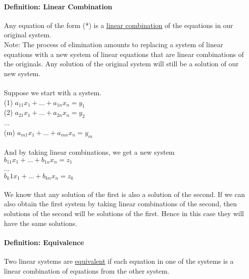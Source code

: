 \documentclass[10pt,letter]{article}
\begin{document}
\paragraph*{Definition: Linear Combination} Any equation of the form (*) is a \underline{linear combination} of the equations in our original system. \\ 
Note: The process of elimination amounts to replacing a system of linear equations with a new system of linear equations that are linear combinations of the originals. Any solution of the original system will still be a solution of our new system. \\ \\ 
Suppose we start with a system. \\ 
(1) $a_{11}x_1 + ... +a_{1n}x_n = y_1$ \\ 
(2) $a_{21}x_1 + ... +a_{2n}x_n = y_2$\\ 
... \\ 
(m) $a_{m1}x_1 + ... +a_{mn}x_n = y_m$ \\ \\ 
And by taking linear combinations, we get a new system\\ 
$b_11x_1+...+b_{1n}x_n = z_1$\\ 
... \\ 
$b_k1x_1+...+b_{kn}x_n=z_k$\\ \\ 
We know that any solution of the first is also a solution of the second. If  we can also obtain the first system by taking linear combinations of the second, then solutions of the second will be solutions of the first. Hence in this case they will have the same solutions. 

\paragraph*{Definition: Equivalence} Two linear systems are \underline{equivalent} if each equation in one of the systems is a linear combination of equations from the other system. 
\end{document}
